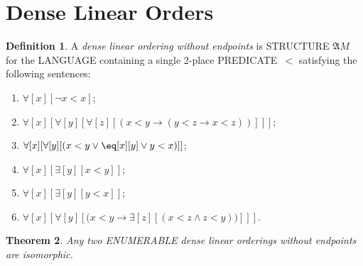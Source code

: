 \documentclass[10pt,a4paper]{article}
\newcommand*{\olup}[1]{\MakeUppercase{#1}}
\theoremstyle{plain}
\newtheorem{thm}{Theorem}[section]
\theoremstyle{definition}
\newtheorem{defn}[thm]{Definition}
\theoremstyle{remark}
\newcommand*{\olfileid}[3]{}
\newcommand*{\olchapter}[3]{}
\newcommand*{\olimport}[1]{}
\newcommand*{\ollabel}[1]{\label{#1}}
\providecommand{\lif}{\mathbin{\rightarrow}}
\providecommand{\lforall}{\mathord{\forall}}
\providecommand{\lexists}{\mathord{\exists}}
\providecommand{\Struct}{\ensuremath{\mathfrak{A}}}
\begin{document}



\olchapter{mod}{bas}{Basics of Model Theory}

\olimport{reducts-and-expansions}

\olimport{substructures}

\olimport{overspill}

\olimport{isomorphism}

\olimport{theory-of-m}

\olimport{partial-iso}

\olimport{dlo}


\OLEndChapterHook





\olfileid{mod}{bas}{dlo}
\section{Dense Linear Orders}

\begin{defn}
  A \emph{dense linear ordering without endpoints} is \olup{structure}
  $\Struct{M}$ for the \olup{language} containing a single 2-place
  \olup{predicate}~$<$ satisfying the following sentences:
  \begin{enumerate}
  \item $\lforall[x][\lnot x < x]$;
  \item $\lforall[x][\lforall[y][\lforall[z][(x < y \lif (y < z \lif x
    <z ))]]]$;
  \item $\lforall[x][\lforall[y][(x< y \lor \eq[x][y] \lor y < x)]]$;
  \item $\lforall[x][\lexists[y][x < y]]$;
  \item $\lforall[x][\lexists[y][y < x]]$;
  \item $\lforall[x][\lforall[y][(x < y \lif \lexists[z][(x < z \land
        z < y))]]]$.
 \end{enumerate}
\end{defn}

\begin{thm}\ollabel{thm:cantorQ}
  Any two \olup{enumerable} dense linear orderings without
  endpoints are isomorphic.
\end{thm}
\end{document}
